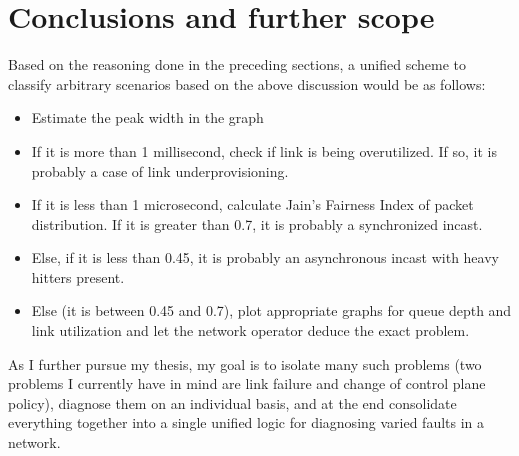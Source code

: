 \section{Conclusions and further scope}

Based on the reasoning done in the preceding sections, a unified scheme to classify arbitrary scenarios based on the above discussion would be as follows:
\begin{itemize}
	\item Estimate the peak width in the graph
	\item If it is more than 1 millisecond, check if link is being overutilized. If so, it is probably a case of link underprovisioning.
	\item If it is less than 1 microsecond, calculate Jain's Fairness Index of packet distribution. If it is greater than 0.7, it is probably a synchronized incast. 
	\item Else, if it is less than 0.45, it is probably an asynchronous incast with heavy hitters present.
	\item Else (it is between 0.45 and 0.7), plot appropriate graphs for queue depth and link utilization and let the network operator deduce the exact problem.
\end{itemize}

As I further pursue my thesis, my goal is to isolate many such problems (two problems I currently have in mind are link failure 
and change of control plane policy), diagnose them on an individual basis, and at the end consolidate everything together into a single unified logic for diagnosing 
varied faults in a network.